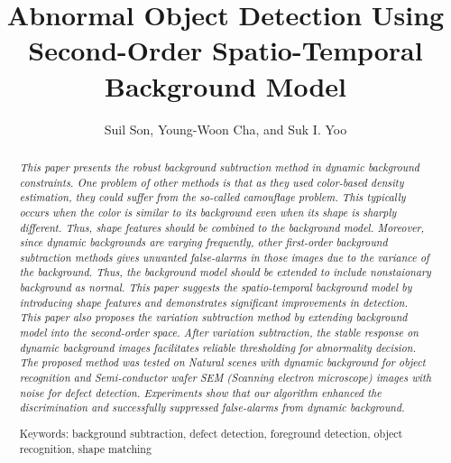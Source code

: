 \documentclass[a4paper,twocolumn, 10pt]{article}
\title{Abnormal Object Detection Using Second-Order Spatio-Temporal Background Model}
\author{Suil Son, Young-Woon Cha, and Suk I. Yoo}
\begin{document}
\maketitle

\begin{abstract}
\emph{
This paper presents the robust background subtraction method in dynamic background constraints. 
One problem of other methods is that as they used color-based density estimation, they could suffer from the so-called camouflage problem. This typically occurs when the color is similar to its background even when its shape is sharply different. Thus, shape features should be combined to the background model.
Moreover, since dynamic backgrounds are varying frequently, other first-order background subtraction methods gives unwanted false-alarms in those images due to the variance of the background. Thus, the background model should be extended to include nonstaionary background as normal. 
This paper suggests the spatio-temporal background model by introducing shape features and demonstrates significant improvements in detection. This paper also proposes the variation subtraction method by extending background model into the second-order space. After variation subtraction, the stable response on dynamic background images facilitates reliable thresholding for abnormality decision. 
The proposed method was tested on Natural scenes with dynamic background for object recognition and Semi-conductor wafer SEM (Scanning electron microscope) images with noise for defect detection. Experiments show that our algorithm enhanced the discrimination and successfully suppressed false-alarms from dynamic background.
}

Keywords:  background subtraction, defect detection, foreground detection, object recognition, shape matching

\end{abstract}
\end{document}

